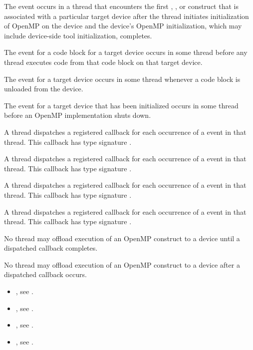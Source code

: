 \events

The  event occurs in a thread that encounters the first 
, , or  construct that 
is associated with a particular target device after the thread initiates 
initialization of OpenMP on the device and the device's OpenMP initialization, 
which may include device-side tool initialization, completes.

The  event for a code block for a target device occurs in some 
thread before any thread executes code from that code block on that target device.

The  event for a target device occurs in some thread
whenever a code block is unloaded from the device.

The  event for a target device that has been initialized
occurs in some thread before an OpenMP implementation shuts down.

\tools

A thread dispatches a registered 
callback for each occurrence of a  event in that 
thread.  This callback has type signature .

A thread dispatches a registered  callback 
for each occurrence of a  event in that thread. This callback 
has type signature .

A thread dispatches a registered 
callback for each occurrence of a  event in
that thread.  This callback has type signature
.

A thread dispatches a registered 
callback for each occurrence of a  event in
that thread.  This callback has type signature
.

\restrictions
No thread may offload execution of an OpenMP construct to a device until a
dispatched  callback completes.

No thread may offload execution of an OpenMP construct to a device after a
dispatched  callback occurs.

\crossreferences
\begin{itemize}
\item {}, see
.

\item {}, see
.

\item {}, see
.

\item {}, see
.
\end{itemize}


